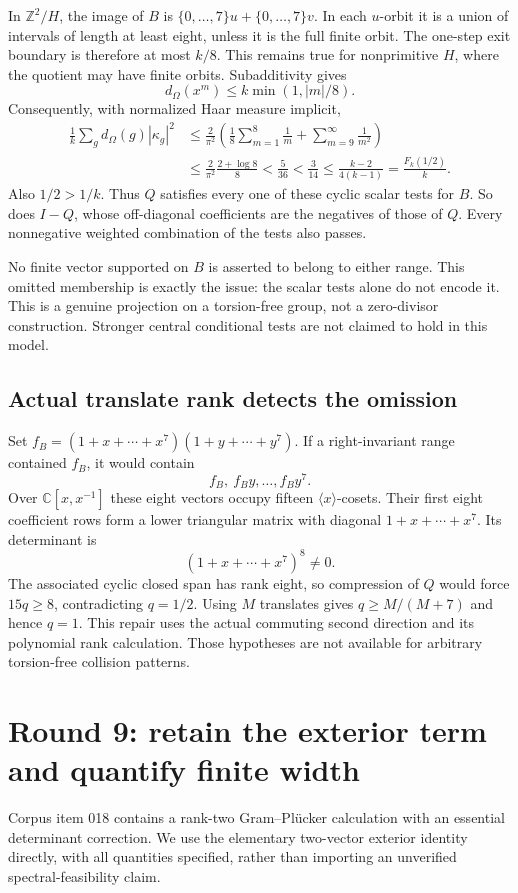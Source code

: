 \documentclass[11pt,a4paper,oneside]{report}
\theoremstyle{definition}
\theoremstyle{remark}
\newcommand{\C}{\mathbb C}
\newcommand{\Z}{\mathbb Z}
\begin{document}
In $\Z^2/H$, the image of $B$ is
$\{0,\ldots,7\}u+\{0,\ldots,7\}v$. In each $u$-orbit
it is a union of intervals of length at least eight, unless it
is the full finite orbit. The one-step exit boundary is therefore
at most $k/8$. This remains true for nonprimitive $H$, where
the quotient may have finite orbits. Subadditivity gives
\[
d_\Omega(x^m)\le k\min(1,|m|/8).
\]
Consequently, with normalized Haar measure implicit,
\begin{align*}
\frac1k\sum_gd_\Omega(g)|\kappa_g|^2
&\le\frac2{\pi^2}\left(
\frac18\sum_{m=1}^8\frac1m+\sum_{m=9}^\infty\frac1{m^2}
\right)\\
&\le\frac2{\pi^2}\frac{2+\log8}{8}
<\frac5{36}<\frac3{14}
\le\frac{k-2}{4(k-1)}=\frac{F_k(1/2)}k.
\end{align*}
Also $1/2>1/k$. Thus $Q$ satisfies every one of these cyclic
scalar tests for $B$. So does $I-Q$, whose off-diagonal
coefficients are the negatives of those of $Q$.
Every nonnegative weighted combination of the tests also passes.

No finite vector supported on $B$ is asserted to belong to either
range. This omitted membership is exactly the issue: the scalar
tests alone do not encode it. This is a genuine projection on a
torsion-free group, not a zero-divisor construction. Stronger
central conditional tests are not claimed to hold in this model.

\subsection{Actual translate rank detects the omission}
Set $f_B=(1+x+\cdots+x^7)(1+y+\cdots+y^7)$.
If a right-invariant range contained $f_B$, it would contain
\[
f_B,\ f_By,\ldots,f_By^7.
\]
Over $\C[x,x^{-1}]$ these eight vectors occupy fifteen
$\langle x\rangle$-cosets. Their first eight coefficient rows
form a lower triangular matrix with diagonal $1+x+\cdots+x^7$.
Its determinant is
\[
(1+x+\cdots+x^7)^8\ne0.
\]
The associated cyclic closed span has rank eight, so compression
of $Q$ would force $15q\ge8$, contradicting $q=1/2$.
Using $M$ translates gives $q\ge M/(M+7)$ and hence $q=1$.
This repair uses the actual commuting second direction and its
polynomial rank calculation. Those hypotheses are not available
for arbitrary torsion-free collision patterns.

\section{Round 9: retain the exterior term and quantify finite width}
Corpus item 018 \cite{B:Corpus018} contains a rank-two
Gram--Pl\"ucker calculation with an essential determinant
correction. We use the elementary two-vector exterior identity
directly, with all quantities specified, rather than importing
an unverified spectral-feasibility claim.
\end{document}
